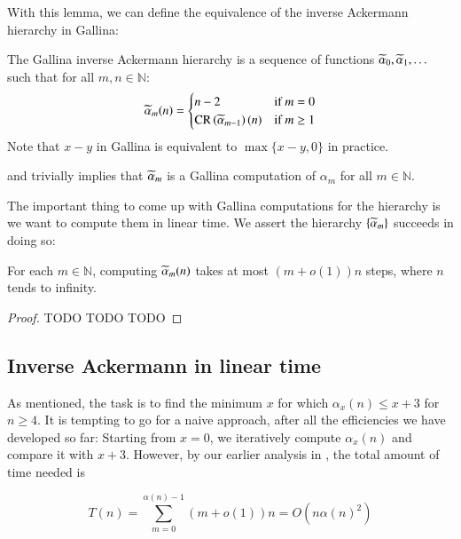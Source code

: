 With this lemma, we can define the equivalence of the inverse 
Ackermann hierarchy in Gallina:

\begin{defn}
The Gallina inverse Ackermann hierarchy is a sequence of 
functions $\widetilde{\alpha}_0, \widetilde{\alpha}_1, \ldots $ such 
that for all $m, n\in \mathbb{N}$:
\begin{equation}
\widetilde{\alpha}_m(n) = \begin{cases}
n - 2 & \text{if } m = 0 \\ \text{CR}\left(\widetilde{\alpha}_{m-1}\right)(n) & \text{if } m \ge 1
\end{cases}
\end{equation}
Note that $x-y$ in Gallina is equivalent to $\max\{x-y, 0\}$ in practice.
\end{defn}

 and  
trivially implies that $\widetilde{\alpha}_m$ is a Gallina 
computation of $\alpha_m$ for all $m\in \mathbb{N}$.

The important thing to come up with Gallina computations 
for the hierarchy is we want to compute them in linear 
time. We assert the hierarchy $\left\{\widetilde{\alpha}_m\right\}$ 
succeeds in doing so:

\begin{thm}  \label{thm: inv_ack_hier linear}
For each $m \in \mathbb{N}$, computing $\widetilde{\alpha}_m(n)$ 
takes at most $(m + o(1))n$ steps, where $n$ tends to infinity.
\end{thm}

\begin{proof}
TODO TODO TODO
\end{proof}

\subsection{Inverse Ackermann in linear time}  \label{subsec: inv_ack linear}

As mentioned, the task is to find the minimum $x$ for 
which $\alpha_x(n) \le x + 3$ for $n\ge 4$. It is tempting 
to go for a naive approach, after all the efficiencies 
we have developed so far: Starting from $x=0$, we 
iteratively compute $\alpha_x(n)$ and compare it with 
$x+3$. However, by our earlier analysis in 
, the total amount of time needed is

$$ T(n) = \sum_{m = 0}^{\alpha(n)-1}(m + o(1))n = O\left(n\alpha(n)^2\right) $$

